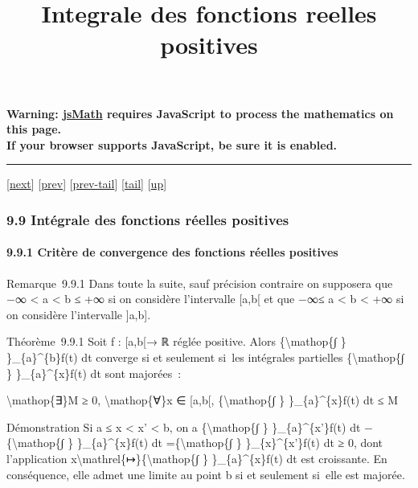 \documentclass[]{article}
\title{Integrale des fonctions reelles positives}
\author{}
\date{}
\begin{document}
\maketitle

\textbf{Warning: \href{http://www.math.union.edu/locate/jsMath}{jsMath}
requires JavaScript to process the mathematics on this page.\\ If your
browser supports JavaScript, be sure it is enabled.}

\begin{center}\rule{3in}{0.4pt}\end{center}

{[}\href{coursse59.html}{next}{]} {[}\href{coursse57.html}{prev}{]}
{[}\href{coursse57.html\#tailcoursse57.html}{prev-tail}{]}
{[}\hyperref[tailcoursse58.html]{tail}{]}
{[}\href{coursch10.html\#coursse58.html}{up}{]}

\subsubsection{9.9 Intégrale des fonctions réelles positives}

\paragraph{9.9.1 Critère de convergence des fonctions réelles positives}

Remarque~9.9.1 Dans toute la suite, sauf précision contraire on
supposera que −∞ \textless{} a \textless{} b ≤ +∞ si on considère
l'intervalle {[}a,b{[} et que −∞≤ a \textless{} b \textless{} +∞ si on
considère l'intervalle {]}a,b{]}.

Théorème~9.9.1 Soit f : {[}a,b{[}→ ℝ réglée positive. Alors
\{\textbackslash{}mathop\{∫ \} \}\_\{a\}\^{}\{b\}f(t) dt converge si et
seulement si~les intégrales partielles \{\textbackslash{}mathop\{∫ \}
\}\_\{a\}\^{}\{x\}f(t) dt sont majorées~:

\textbackslash{}mathop\{∃\}M ≥ 0, \textbackslash{}mathop\{∀\}x ∈
{[}a,b{[}, \{\textbackslash{}mathop\{∫ \} \}\_\{a\}\^{}\{x\}f(t) dt ≤ M

Démonstration Si a ≤ x \textless{} x' \textless{} b, on a
\{\textbackslash{}mathop\{∫ \} \}\_\{a\}\^{}\{x'\}f(t) dt
−\{\textbackslash{}mathop\{∫ \} \}\_\{a\}\^{}\{x\}f(t) dt
=\{\textbackslash{}mathop\{∫ \} \}\_\{x\}\^{}\{x'\}f(t) dt ≥ 0, dont
l'application x\textbackslash{}mathrel\{↦\}\{\textbackslash{}mathop\{∫
\} \}\_\{a\}\^{}\{x\}f(t) dt est croissante. En conséquence, elle admet
une limite au point b si et seulement si~elle est majorée.
\end{document}
